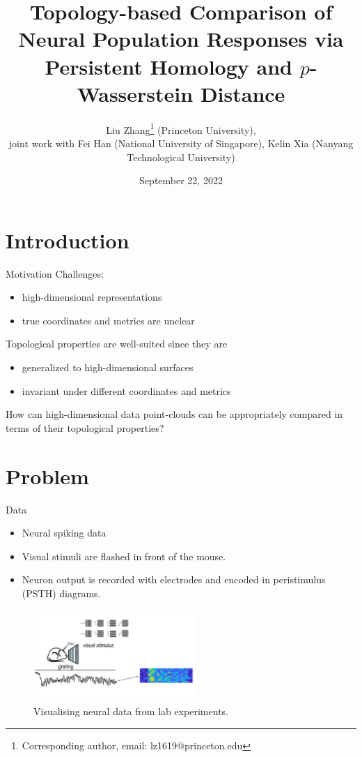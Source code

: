 \documentclass[xcolor={dvipsnames,svgnames}]{beamer}
\title{Topology-based Comparison of Neural Population Responses via Persistent Homology and $p$-Wasserstein Distance}
\author{Liu Zhang\footnote{Corresponding author, email: lz1619@princeton.edu} (Princeton University), \\joint work with Fei Han (National University of Singapore), Kelin Xia (Nanyang Technological University)}
\date{September 22, 2022}
\begin{document}
\section{Introduction}
\begin{frame}
\titlepage
\end{frame}
\begin{frame}{Motivation}
Challenges:
\begin{itemize}
    \item high-dimensional representations
    \item true coordinates and metrics are unclear
\end{itemize}

Topological properties are well-suited since they are
\begin{itemize}
    \item generalized to high-dimensional surfaces
    \item invariant under different coordinates and metrics 
\end{itemize} 

How can high-dimensional data point-clouds can be appropriately compared in terms of their topological properties? 
\end{frame}
\section{Problem}

\begin{frame}{Data}
 \begin{itemize}
 \item Neural spiking data
        \item Visual stimuli are flashed in front of the mouse.
        \item Neuron output is recorded with electrodes and encoded in peristimulus (PSTH) diagrams.
    \end{itemize} 
 \begin{figure}[H]
        \centering
            \includegraphics[width=0.55\textwidth]{figures/Slide5.jpg}
            \caption{Visualising neural data from lab experiments.}
    \end{figure}
\end{frame}
\end{document}
